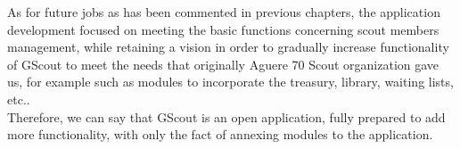 As for future jobs as has been commented in previous chapters, the application development focused on meeting the basic functions
concerning scout members management, while retaining a vision in order to gradually increase functionality of GScout
to meet the needs that originally Aguere 70 Scout organization gave us, for example such as modules to incorporate the treasury, library, waiting lists, etc..\\

Therefore, we can say that GScout is an open application, fully prepared to add more functionality, with only the fact of annexing
modules to the application.



